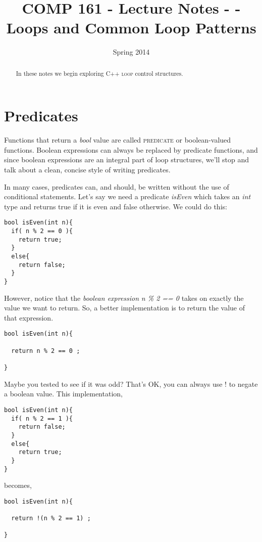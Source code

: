 \documentclass[]{tufte-handout}
\title{COMP 161 - Lecture Notes -  - Loops and Common Loop Patterns}
\date{Spring 2014}
\begin{document}
 
\maketitle

\begin{abstract}
In these notes we begin exploring C++ \textsc{loop} control structures.
\end{abstract}

\section{Predicates}

Functions that return a \textit{bool} value are called \textsc{predicate} or boolean-valued functions. Boolean expressions can always be replaced by predicate functions, and since boolean expressions are an integral part of loop structures, we'll stop and talk about a clean, concise style of writing predicates.

In many cases, predicates can, and should, be written without the use of conditional statements.  Let's say we need a predicate \textit{isEven} which takes an \textit{int} type and returns true if it is even and false otherwise.  We could do this:
\begin{verbatim}
bool isEven(int n){
  if( n % 2 == 0 ){
    return true;
  }
  else{
    return false;
  }
}
\end{verbatim}

However, notice that the \textit{boolean expression} \textit{n \% 2 == 0} takes on exactly the value we want to return. So, a better implementation is to return the value of that expression.
\begin{verbatim}
bool isEven(int n){
  
  return n % 2 == 0 ;

}
\end{verbatim}

Maybe you tested to see if it was odd?  That's OK, you can always use ! to negate a boolean value. This implementation,
\begin{verbatim}
bool isEven(int n){
  if( n % 2 == 1 ){
    return false;
  }
  else{
    return true;
  }
}
\end{verbatim}
becomes,
\begin{verbatim}
bool isEven(int n){
  
  return !(n % 2 == 1) ;

}
\end{verbatim}
\end{document}
